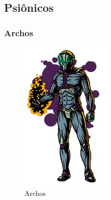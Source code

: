 \documentclass[11pt]{article} %
\begin{document}
\subsection{Psiônicos}

\subsubsection{Archos}

\newpage

\begin{figure}[!htp]
\centering
\includegraphics[scale=0.5]{res/characters/Archos.png}
\caption{Archos}
\label{Archos}
\end{figure}
\end{document}
